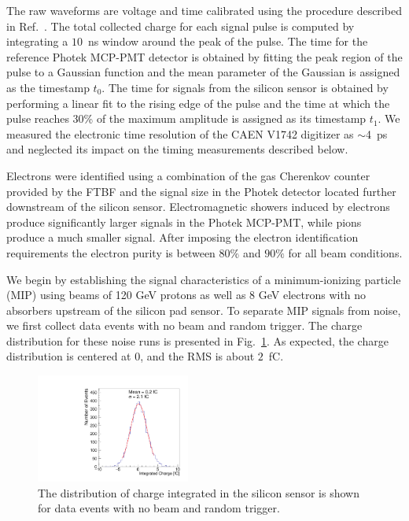 \documentclass[12pt]{article}
\begin{document}
{The raw waveforms are voltage and time calibrated using the  procedure
described in Ref.~\cite{Kim201467}. The total collected charge for each signal
pulse is computed by integrating a $10$~ns window around the peak of the pulse.
The time for the reference Photek MCP-PMT detector is obtained by fitting the
peak region of the pulse to a Gaussian function and the mean parameter of the
Gaussian is assigned as the timestamp $t_0$. The time for signals from the
silicon sensor is obtained by performing a linear fit to the rising edge of the
pulse and the time at which the pulse reaches 30\% of the maximum amplitude is
assigned as its timestamp $t_1$. We measured the electronic time resolution
of the CAEN V1742 digitizer as $\sim$4~ps and neglected its impact on the timing
measurements described below.

Electrons were identified using a combination of the gas Cherenkov counter
provided by the FTBF and the signal size in the Photek detector located further
downstream of the silicon sensor. Electromagnetic showers induced by electrons
produce significantly larger signals in the Photek MCP-PMT, while pions produce
a much smaller signal. After imposing the electron identification 
requirements the electron purity is between $80\%$ and $90\%$ for all beam
conditions. 

We begin by establishing the signal characteristics of a minimum-ionizing
particle (MIP) using beams of 120 GeV protons as well as 8 GeV electrons with no
absorbers upstream of the silicon pad sensor. To separate MIP signals from
noise, we first collect data events with no beam and random trigger. The charge
distribution for these noise runs is presented in Fig.~\ref{fig:noise}. As expected,
the charge distribution is centered at $0$, and the RMS is about
$2$~fC. 

\begin{figure}[htbp] 
\centering
\includegraphics[width=0.45\textwidth]{plots/NoiseNoBeam_charge.pdf} 
\caption{The distribution of charge integrated in the silicon sensor is shown for data events with no beam and random trigger. } 
\label{fig:noise} 
\end{figure} 

}
\end{document}
